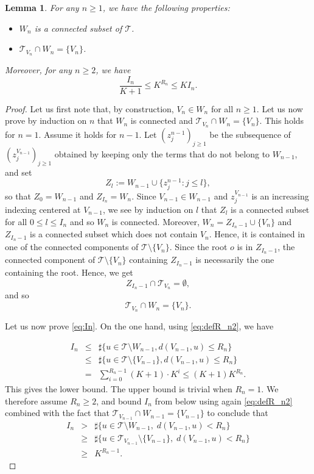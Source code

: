 \documentclass[french]{article}
\newcommand{\zi}{z}
\newtheorem{lemma}[theorem]{Lemma}
\newcommand{\T}{\mathcal{T}}
\renewcommand{\1}{\mathds{1}}
\begin{document}
\begin{lemma}\label{lem:lienIetR}
    For any $n\ge 1$, we have the following properties:
    \begin{itemize}
        \item $W_n$ is a connected subset of $\T$. 
        \item $\T_{V_n}\cap W_n=\{V_n\}$. 
    \end{itemize} Moreover, for any $n\ge 2$, we have
    \begin{equation}\label{eq:In}
        \frac{I_n}{K+1}\le K^{R_n}\le K I_n.
    \end{equation}
\end{lemma}

\begin{proof} Let us first note that, by construction, $V_{n}\in W_{n}$ for all $n\ge 1$. 
    Let us now prove by induction on $n$ that $W_n$ is connected and $\T_{V_n}\cap W_n=\{V_n\}$. This holds for $n=1$. Assume it holds for $n-1$. Let $(\zi_j^{n-1})_{j\ge 1}$ be the subsequence of $(\zi_j^{V_{n-1}})_{j\ge 1}$ obtained by keeping only the terms that do not belong to $W_{n-1}$, and set
    $$Z_l:=W_{n-1}\cup \{\zi_j^{n-1}: j\le l\},$$
    so that $Z_0=W_{n-1}$ and $Z_{I_n}=W_n$. Since $V_{n-1}\in W_{n-1}$ and $\zi_j^{V_{n-1}}$ is an increasing indexing centered at $V_{n-1}$, we see by induction on $l$ that $Z_l$ is a connected subset for all $0\le l\le I_n$ and so $W_n$ is connected. Moreover, $W_n=Z_{I_n-1}\cup\{V_n\}$ and $Z_{I_n-1}$ is a connected subset which does not contain $V_n$. Hence, it is contained in one of the connected components of $\T\setminus \{V_n\}$. Since the root $o$ is in $Z_{I_n-1}$, the connected component of $\T\setminus \{V_n\}$ containing $Z_{I_n-1}$ is necessarily the one containing the root. Hence, we get 
    $$Z_{I_n-1}\cap \T_{V_n}=\emptyset,$$ 
    and so $$\T_{V_n}\cap W_n=\{V_n\}.$$

    Let us now prove \eqref{eq:In}. On the one hand, using \eqref{eq:defR_n2}, we have 

\begin{eqnarray*}
    I_n &\le & \sharp\{u\in \T\setminus W_{n-1}, d(V_{n-1},u)\le R_{n}\}\\
    &\le& \sharp\{u\in \T\setminus \{V_{n-1}\}, d(V_{n-1},u)\le R_{n}\}\\
    &= & \sum_{i=0}^{R_n-1}  (K+1)\cdot K^{i}\le (K+1)K^{R_n}.
\end{eqnarray*}
This gives the lower bound. The upper bound is trivial when $R_n = 1$. We therefore assume $R_n \geq 2$, and bound $I_n$ from below using again \eqref{eq:defR_n2} combined with the fact that $\T_{V_{n-1}}\cap W_{n-1}=\{V_{n-1}\}$ to conclude that
\begin{eqnarray*}
    I_n &> & \sharp\{u\in \T\setminus W_{n-1}, \; d(V_{n-1},u)< R_{n}\}\\
    &\ge& \sharp\{u\in \T_{V_{n-1}}\setminus\{V_{n-1}\}, \; d(V_{n-1},u)< R_{n}\}\\
    &\ge& K^{R_n-1}.
\end{eqnarray*}
\end{proof}
\end{document}
